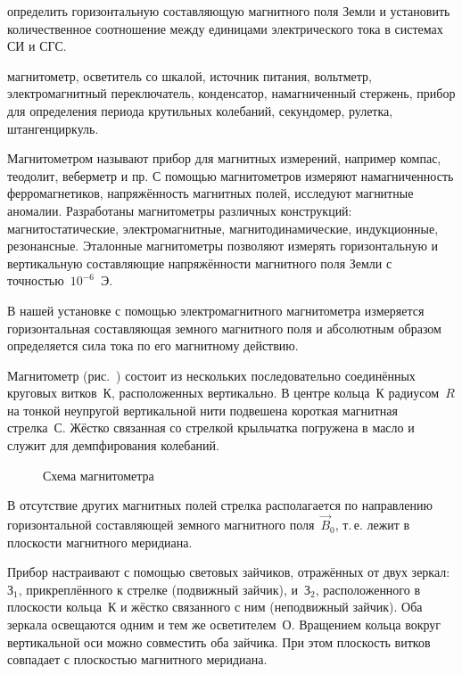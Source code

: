 
\begin{lab:aim}
    определить горизонтальную составляющую магнитного поля Земли и установить
количественное соотношение между единицами электрического тока в системах СИ и
СГС.
\end{lab:aim}

\begin{lab:equipment}
    магнитометр, осветитель со шкалой, источник питания, вольтметр,
электромагнитный переключатель, конденсатор, намагниченный стержень, прибор для
определения периода крутильных колебаний, секундомер, рулетка, штангенциркуль.
\end{lab:equipment}

Магнитометром называют прибор для магнитных измерений, например компас,
теодолит, веберметр и пр. С помощью
магнитометров измеряют намагниченность ферромагнетиков, напряжённость магнитных
полей, исследуют магнитные аномалии.
Разработаны магнитометры различных конструкций: магнитостатические,
электромагнитные, магнитодинамические, индукционные,
резонансные. Эталонные магнитометры позволяют измерять горизонтальную и
вертикальную составляющие напряжённости
магнитного поля Земли с точностью~$10^{-6}$~Э.

В нашей установке с помощью электромагнитного магнитометра измеряется
горизонтальная составляющая земного магнитного
поля и абсолютным образом определяется сила тока по его магнитному действию.

\experiment

Магнитометр (рис.~) состоит из нескольких
последовательно соединённых круговых витков~К, расположенных
вертикально. В центре кольца~К радиусом~$R$
на тонкой неупругой вертикальной нити подвешена
короткая магнитная стрелка~С. Жёстко связанная со стрелкой крыльчатка погружена
в масло и служит для демпфирования колебаний.

\begin{figure}[h!]
    \centering
    \caption{Схема магнитометра}
\end{figure}

В отсутствие других магнитных полей стрелка располагается по направлению
горизонтальной составляющей земного магнитного
поля~$\vec{B}_0$, т.\,е. лежит в плоскости магнитного меридиана.

Прибор настраивают с помощью световых зайчиков, отражённых от двух зеркал:~$З_1$,
прикреплённого к стрелке (подвижный зайчик), и~$З_2$, расположенного в плоскости
кольца~К и жёстко связанного с ним (неподвижный зайчик). Оба зеркала
освещаются одним и тем же осветителем~О. Вращением кольца вокруг вертикальной
оси можно совместить оба зайчика. При этом плоскость витков совпадает
с плоскостью магнитного меридиана.

